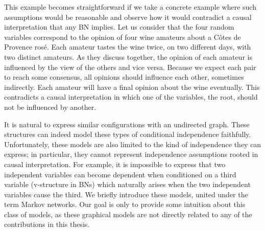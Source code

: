 This example becomes straightforward if we take a concrete example where such assumptions would be reasonable and observe how it would contradict a causal interpretation that any BN implies. Let us consider that the four random variables correspond to the opinion of four wine amateurs about a C{\^o}tes de Provence ros{\'e}. Each amateur tastes the wine twice, on two different days, with two distinct amateurs. As they discuss together, the opinion of each amateur is influenced by the view of the others and vice versa. Because we expect each pair to reach some consensus, all opinions should influence each other, sometimes indirectly.  Each amateur will have a final opinion about the wine eventually. This contradicts a causal interpretation in which one of the variables, the root, should not be influenced by another.

It is natural to express similar configurations with an undirected graph. These structures can indeed model these types of conditional independence faithfully. Unfortunately, these models are also limited to the kind of independence they can express; in particular, they cannot represent independence assumptions rooted in causal interpretation. For example, it is impossible to express that two independent variables can become dependent when conditioned on a third variable (v-structure in BNs) which naturally arises when the two independent variables cause the third. We briefly introduce these models, united under the term Markov networks. Our goal is only to provide some intuition about this class of models, as these graphical models are not directly related to any of the contributions in this thesis.
